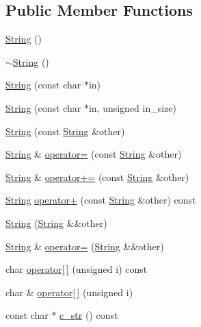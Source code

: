 \subsection*{Public Member Functions}
\begin{DoxyCompactItemize}
\item 
\hyperlink{classdoctest_1_1String_ab18d26f6c9e728c2fac77a501b8ca5f5}{String} ()
\item 
\hyperlink{classdoctest_1_1String_af5dce5deeb8f25a4866efdff75e92975}{$\sim$\+String} ()
\item 
\hyperlink{classdoctest_1_1String_abb4449cbc613cd973ae774c704fca5dd}{String} (const char $\ast$in)
\item 
\hyperlink{classdoctest_1_1String_a01d9f84ab0a3dc67b195678b6073dd4c}{String} (const char $\ast$in, unsigned in\+\_\+size)
\item 
\hyperlink{classdoctest_1_1String_a27ca7976da20bdebbf225fa496c38ad1}{String} (const \hyperlink{classdoctest_1_1String}{String} \&other)
\item 
\hyperlink{classdoctest_1_1String}{String} \& \hyperlink{classdoctest_1_1String_a1979700c536cfe9b5fecc328245f74ca}{operator=} (const \hyperlink{classdoctest_1_1String}{String} \&other)
\item 
\hyperlink{classdoctest_1_1String}{String} \& \hyperlink{classdoctest_1_1String_ad1df797f12cd140e3d1739f2b30b64d2}{operator+=} (const \hyperlink{classdoctest_1_1String}{String} \&other)
\item 
\hyperlink{classdoctest_1_1String}{String} \hyperlink{classdoctest_1_1String_a6ddb6cf1b744a0ae1d4e26b3c8dfa827}{operator+} (const \hyperlink{classdoctest_1_1String}{String} \&other) const
\item 
\hyperlink{classdoctest_1_1String_a4bbdcb36cd68988953c3bb2d18e53210}{String} (\hyperlink{classdoctest_1_1String}{String} \&\&other)
\item 
\hyperlink{classdoctest_1_1String}{String} \& \hyperlink{classdoctest_1_1String_a6099dbedeb150eb5659c7aa5dcea1727}{operator=} (\hyperlink{classdoctest_1_1String}{String} \&\&other)
\item 
char \hyperlink{classdoctest_1_1String_adf69290bc23e8c7bf60a9bcf765ebc10}{operator\mbox{[}$\,$\mbox{]}} (unsigned i) const
\item 
char \& \hyperlink{classdoctest_1_1String_acd37c72485c1277fc673f6b328138b40}{operator\mbox{[}$\,$\mbox{]}} (unsigned i)
\item 
const char $\ast$ \hyperlink{classdoctest_1_1String_a607c6977b193fecf29622110e6081625}{c\+\_\+str} () const

\end{DoxyCompactItemize}
